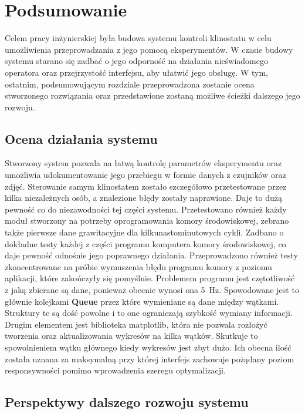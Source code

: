 \chapter{Podsumowanie}

Celem pracy inżynierskiej była budowa systemu kontroli klinostatu w celu umożliwienia przeprowadzania z jego pomocą eksperymentów. W czasie budowy systemu starano się zadbać o jego odporność na działania nieświadomego operatora oraz przejrzystość interfejsu, aby ułatwić jego obsługę. W tym, ostatnim, podsumowującym rozdziale przeprowadzona zostanie ocena stworzonego rozwiązania oraz przedstawione zostaną możliwe ścieżki dalszego jego rozwoju.


\section{Ocena działania systemu}

Stworzony system pozwala na łatwą kontrolę parametrów eksperymentu oraz umożliwia udokumentowanie jego przebiegu w formie danych z czujników oraz zdjęć. Sterowanie samym klinostatem zostało szczegółowo przetestowane przez kilka niezależnych osób, a znalezione błędy zostały naprawione. Daje to dużą pewność co do niezawodności tej części systemu. Przetestowano również każdy moduł stworzony na potrzeby oprogramowania komory środowiskowej, zebrano także pierwsze dane grawitacyjne dla kilkunastominutowych cykli. Zadbano o dokładne testy każdej z części programu komputera komory środowiskowej, co daje pewność odnośnie jego poprawnego działania. Przeprowadzono również testy zkoncentrowane na próbie wymuszenia błędu programu komory z poziomu aplikacji, które zakończyły się pomyślnie. Problemem programu jest czętotliwość z jaką zbierane są dane, ponieważ obecnie wynosi ona \SI{5}{Hz}. Spowodowane jest to głównie kolejkami \textbf{Queue} przez które wymieniane są dane między wątkami. Struktury te są dość powolne i to one ograniczają szybkość wymiany informacji. Drugim elementem jest biblioteka matplotlib, która nie pozwala rozłożyć tworzenia oraz aktualizowania wykresów na kilka wątków. Skutkuje to spowolnieniem wątku głównego kiedy wykresów jest zbyt dużo. Ich obecna ilość została uznana za maksymalną przy której interfejs zachowuje pożądany poziom responsywności pomimo wprowadzenia szeregu optymalizacji.

\section{Perspektywy  dalszego rozwoju systemu}

